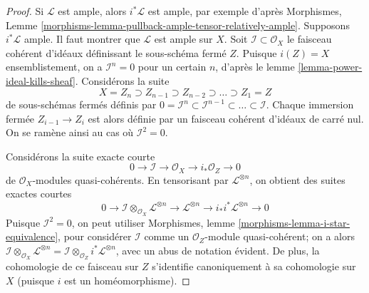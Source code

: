 \begin{proof}
Si $\mathcal{L}$ est ample, alors $i^*\mathcal{L}$ est ample, par
exemple d'après Morphismes, Lemme
\ref{morphisms-lemma-pullback-ample-tensor-relatively-ample}.
Supposons $i^*\mathcal{L}$ ample. Il faut montrer que $\mathcal{L}$
est ample sur $X$.
Soit $\mathcal{I} \subset \mathcal{O}_X$ le faisceau cohérent d'idéaux
définissant le sous-schéma fermé $Z$. Puisque $i(Z) = X$ ensemblistement,
on a $\mathcal{I}^n = 0$ pour un certain $n$, d'après
le lemme \ref{lemma-power-ideal-kills-sheaf}.
Considérons la suite
$$
X = Z_n \supset Z_{n - 1} \supset Z_{n - 2} \supset \ldots \supset Z_1 = Z
$$
de sous-schémas fermés définis par
$0 = \mathcal{I}^n \subset \mathcal{I}^{n - 1} \subset \ldots \subset
\mathcal{I}$. Chaque immersion fermée $Z_{i - 1} \to Z_{i}$
est alors définie par un faisceau cohérent d'idéaux de carré nul. On se
ramène ainsi au cas où $\mathcal{I}^2 = 0$.

\medskip\noindent
Considérons la suite exacte courte
$$
0 \to \mathcal{I} \to \mathcal{O}_X \to i_*\mathcal{O}_Z \to 0
$$
de $\mathcal{O}_X$-modules quasi-cohérents. En tensorisant par
$\mathcal{L}^{\otimes n}$, on obtient des suites exactes courtes
\begin{equation}
\label{equation-ses}
0 \to \mathcal{I} \otimes_{\mathcal{O}_X} \mathcal{L}^{\otimes n}
\to \mathcal{L}^{\otimes n} \to i_*i^*\mathcal{L}^{\otimes n} \to 0
\end{equation}
Puisque $\mathcal{I}^2 = 0$, on peut utiliser
Morphismes, lemme \ref{morphisms-lemma-i-star-equivalence},
pour considérer $\mathcal{I}$ comme un $\mathcal{O}_Z$-module quasi-cohérent;
on a alors $\mathcal{I} \otimes_{\mathcal{O}_X} \mathcal{L}^{\otimes n} =
\mathcal{I} \otimes_{\mathcal{O}_Z} i^*\mathcal{L}^{\otimes n}$,
avec un abus de notation
évident. De plus, la cohomologie de ce faisceau sur $Z$ s'identifie
canoniquement à sa cohomologie sur $X$ (puisque $i$ est un
homéomorphisme).


\end{proof}
